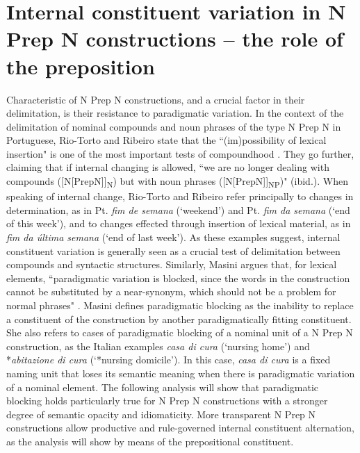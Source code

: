 \documentclass[output=paper]{langsci/langscibook}
\begin{document}
\section{Internal constituent variation in N Prep N constructions – the role of the preposition} 
Characteristic of N Prep N constructions, and a crucial factor in their delimitation, is their resistance to paradigmatic variation. In the context of the delimitation of nominal compounds and noun phrases of the type N Prep N in Portuguese, Rio-Torto and Ribeiro state that the ``(im)possibility of lexical insertion" is one of the most important tests of compoundhood \citep[9]{RioTorto:2012}. They go further, claiming that if internal changing is allowed, ``we are no longer dealing with compounds ([N[PrepN]]\textsubscript{N})  but with noun phrases ([N[PrepN]]\textsubscript{NP})" (ibid.). When speaking of internal change, Rio-Torto and Ribeiro refer principally to changes in determination, as in Pt. \textit{fim de semana} (`weekend') and Pt. \textit{fim da semana} (`end of this week'), and to changes effected through insertion of lexical material, as in \textit{fim da última semana} (`end of last week'). As these examples suggest, internal constituent variation is generally seen as a crucial test of delimitation between compounds and syntactic structures. Similarly, Masini argues that, for lexical elements, ``paradigmatic variation is blocked, since the words in the construction cannot be substituted by a near-synonym, which should not be a problem for normal phrases" \citep[259]{Masini:2009}. Masini defines paradigmatic blocking as the inability to replace a constituent of the construction by another paradigmatically fitting constituent. She also refers to cases of paradigmatic blocking of a nominal unit of a N Prep N construction, as the Italian examples \textit{casa di cura} (`nursing home') and *\textit{abitazione di cura} (`*nursing domicile'). In this case, \textit{casa di cura} is a fixed naming unit that loses its semantic meaning when there is paradigmatic variation of a nominal element. The following analysis will show that paradigmatic blocking holds particularly true for N Prep N constructions with a stronger degree of semantic opacity and idiomaticity. More transparent N Prep N constructions allow productive and rule-governed internal constituent alternation, as the analysis will show by means of the prepositional constituent.
 
\end{document}
